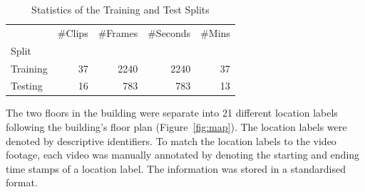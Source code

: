 \documentclass{article}
\begin{document}
  \begin{table}[h]
    \centering
    \begin{tabular}{lrrrr}
    \toprule
     & \#Clips & \#Frames & \#Seconds & \#Mins \\
    Split &  &  &  &  \\
    \midrule
    Training & 37 & 2240 &  2240 & 37 \\
    Testing & 16 & 783 & 783 & 13 \\
    \bottomrule
    \end{tabular}
    \caption{Statistics of the Training and Test Splits}
    \label{tab:data-stats}
  \end{table}


  The two floors in the building were separate into 21 different location labels
  following the building's floor plan (Figure~\ref{fig:map}). The location
  labels were denoted by descriptive identifiers. To match the location labels
  to the video footage, each video was manually annotated by denoting the
  starting and ending time stamps of a location label. The information was
  stored in a standardised format.
\end{document}
